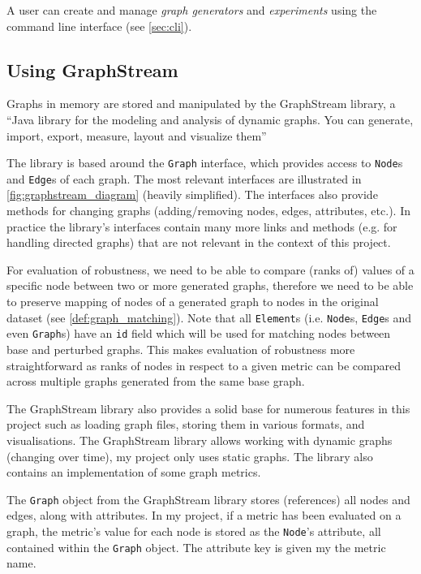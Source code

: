 A user can create and manage \textsl{graph generators} and \textsl{experiments} using the command line interface (see \autoref{sec:cli}).

\subsection{Using GraphStream}

Graphs in memory are stored and manipulated by the GraphStream library\cite{DutotGraphStreamToolBridging2007}, a \enquote{Java library for the modeling and analysis of dynamic graphs. You can generate, import, export, measure, layout and visualize them}



The library is based around the \texttt{Graph} interface, which provides access to \texttt{Node}s and \texttt{Edge}s of each graph.
The most relevant interfaces are illustrated in \autoref{fig:graphstream_diagram} (heavily simplified).
The interfaces also provide methods for changing graphs (adding/removing nodes, edges, attributes, etc.).
In practice the library's interfaces contain many more links and methods (e.g. for handling directed graphs) that are not relevant in the context of this project.

For evaluation of robustness, we need to be able to compare (ranks of) values of a specific node between two or more generated graphs, therefore we need to be able to preserve mapping of nodes of a generated graph to nodes in the original dataset (see \autoref{def:graph_matching}).
Note that all \texttt{Element}s (i.e. \texttt{Node}s, \texttt{Edge}s and even \texttt{Graph}s) have an \texttt{id} field which will be used for matching nodes between base and perturbed graphs.
This makes evaluation of robustness more straightforward as ranks of nodes in respect to a given metric can be compared across multiple graphs generated from the same base graph.

The GraphStream library also provides a solid base for numerous features in this project such as loading graph files, storing them in various formats, and visualisations.
The GraphStream library allows working with dynamic graphs (changing over time), my project only uses static graphs.
The library also contains an implementation of some graph metrics.

\parspace

The \texttt{Graph} object from the GraphStream library stores (references) all nodes and edges, along with attributes.
In my project, if a metric has been evaluated on a graph, the metric's value for each node is stored as the \texttt{Node}'s attribute, all contained within the \texttt{Graph} object.
The attribute key is given my the metric name.

